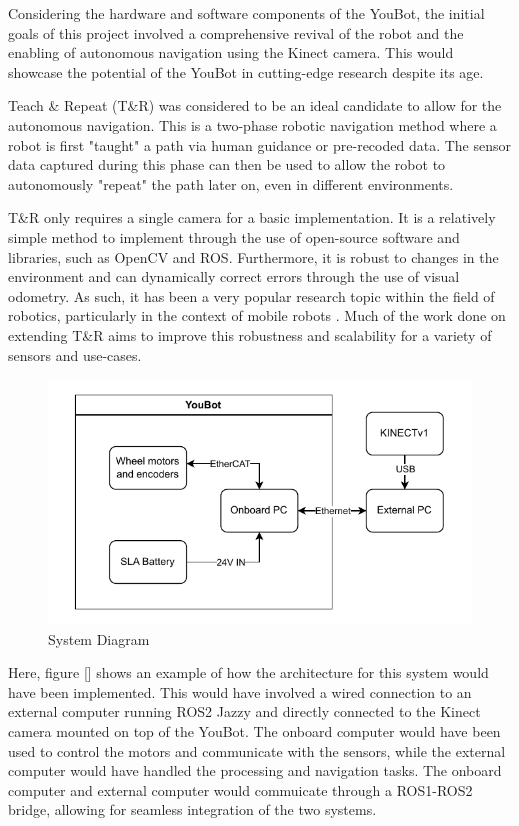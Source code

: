 \documentclass[a4paper, 12pt]{article}
\newif\ifshowadi
\newcommand{\adi}[1]{\ifshowadi\textcolor{red}{#1}\fi}
\newif\ifshownotes
\newcommand{\notes}[1]{\ifshownotes\textcolor{blue}{#1}\fi}
\begin{document}
    Considering the hardware and software components of the YouBot, the initial goals of this project involved a comprehensive revival of the robot and the enabling of autonomous navigation using the Kinect camera. This would showcase the potential of the YouBot in cutting-edge research despite its age. 

    Teach \& Repeat (T\&R) was considered to be an ideal candidate to allow for the autonomous navigation. This\notes{[cite]} is a two-phase robotic navigation method where a robot is first "taught" a path via human guidance or pre-recoded data. The sensor data captured during this phase can then be used to allow the robot to autonomously "repeat" the path later on, even in different environments.

    T\&R only requires a single camera for a basic implementation. It is a relatively simple method to implement through the use of open-source software and libraries, such as OpenCV and ROS. Furthermore, it is robust to changes in the environment and can dynamically correct errors through the use of visual odometry. As such, it has been a very popular research topic within the field of robotics, particularly in the context of mobile robots \notes{[cite]}. Much of the work done on extending T\&R aims to improve this robustness and scalability for a variety of sensors and use-cases. 

    \adi{I'm not sure how the ROS stack would look like, or if its necessary to explain. Discuss with advisor}
    \begin{figure}[ht]
        \centering
        \includegraphics[width=\linewidth]{diagrams/sample.pdf}
        \caption{System Diagram}
        \label{fig:system-diagram}
    \end{figure}


    Here, figure [] shows an example of how the architecture for this system would have been implemented. This would have involved a wired connection to an external computer running ROS2 Jazzy and directly connected to the Kinect camera mounted on top of the YouBot. The onboard computer would have been used to control the motors and communicate with the sensors, while the external computer would have handled the processing and navigation tasks. The onboard computer and external computer would commuicate through a ROS1-ROS2 bridge, allowing for seamless integration of the two systems. 
\end{document}
